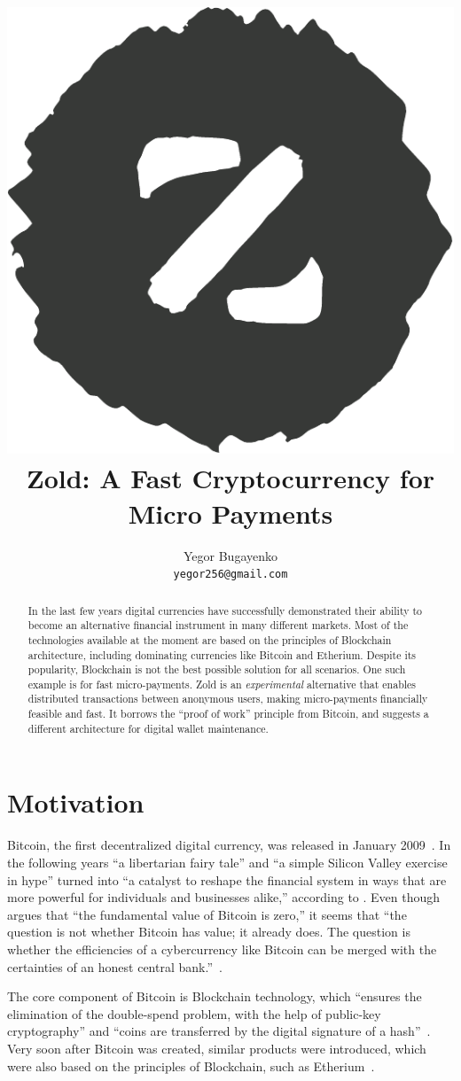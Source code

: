 \documentclass[11pt,oneside]{article}
\title{\includegraphics[scale=0.3]{../images/logo.pdf}\\Zold: A Fast Cryptocurrency for Micro Payments}
\author{Yegor Bugayenko\\\texttt{yegor256@gmail.com}\\[1em]\href{https://github.com/zold-io/papers/releases/tag/\zoldversion}{\texttt{\zoldversion}}}
\begin{document}
\raggedbottom

\maketitle
\begin{abstract}
In the last few years digital currencies have successfully demonstrated
their ability to become an alternative financial instrument in many
different markets. Most of the technologies available at the moment are
based on the principles of Blockchain architecture, including
dominating currencies like Bitcoin and Etherium. Despite its
popularity, Blockchain is not the best possible solution for all scenarios.
One such example is for fast micro-payments.
Zold is an \emph{experimental} alternative that enables distributed transactions between
anonymous users, making micro-payments financially feasible and fast.
It borrows the ``proof of work'' principle from Bitcoin,
and suggests a different architecture for digital wallet maintenance.
\end{abstract}

\section{Motivation}

Bitcoin, the first decentralized digital currency, was released in January 2009~\parencite{nakamoto2008}.
In the following years ``a libertarian fairy tale'' and ``a simple Silicon Valley exercise in hype''
turned into ``a catalyst to reshape the financial system in ways that are more
powerful for individuals and businesses alike,'' according to \textcite{andreessen2014}.
Even though \textcite{cheah2015} argues that
``the fundamental value of Bitcoin is zero,''
it seems that ``the question is not whether Bitcoin has value; it already does.
The question is whether the efficiencies of a cybercurrency
like Bitcoin can be merged with the certainties of an honest central bank.''~\parencite{van2014}.

The core component of Bitcoin is Blockchain technology, which
``ensures the elimination of the double-spend problem, with the help
of public-key cryptography'' and ``coins are transferred by the
digital signature of a hash''~\parencite{pilkington2016}.
Very soon after Bitcoin was created, similar products were introduced,
which were also based on the principles of Blockchain, such as
Etherium~\parencite{buterin2013}.
\end{document}
